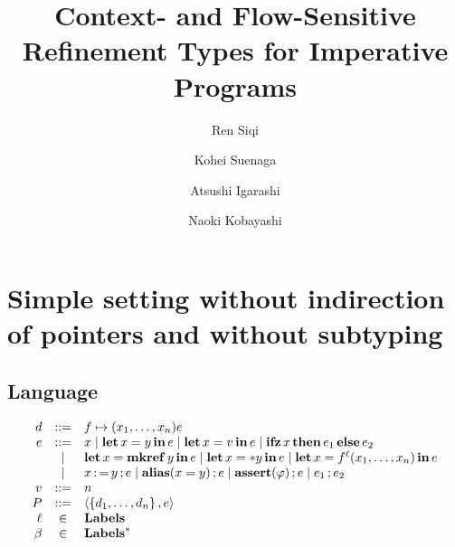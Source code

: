 \documentclass[runningheads]{llncs}
\begin{document}
%
\title{Context- and Flow-Sensitive Refinement Types for Imperative Programs}
%
%
\author{Ren Siqi \and Kohei Suenaga \and Atsushi Igarashi \and Naoki Kobayashi}
%
%
\institute{}
%
\maketitle              %
%
\begin{abstract}

\keywords{}
\end{abstract}
%
%
%

\section{Simple setting without indirection of pointers and without subtyping}

\newcommand\val{v}

\subsection{Language}

\[
  \begin{array}{rcl}
  \decl &::=& f \mapsto (x_1,\dots,x_n)\expr \\
  \expr &::= &
              x \mid
              \LET x = y \IN \expr \mid
              \LET x = \val \IN \expr \mid
              \IFZERO x \THEN \expr_1 \ELSE \expr_2  \\ &\mid&
              \LET x = \MKREF y \IN \expr \mid
              \LET x = *y \IN \expr \mid
              \LET x = f^\ell(x_1,\dots,x_n) \IN \expr \\ &\mid&
              x \WRITE y \SEQ \expr \mid
              \ALIAS(x = y) \SEQ \expr \mid
              \ASSERT(\varphi) \SEQ \expr \mid \expr_1 \SEQ \expr_2 \\
    \val &::=& n \\
    \prog &::=& \tuple{\set{\decl_1, \dots, \decl_n}, \expr}\\
    \pp &\in& \textbf{Labels}\\
  \pps &\in& \textbf{Labels}^*
  \end{array}
\]
\end{document}
